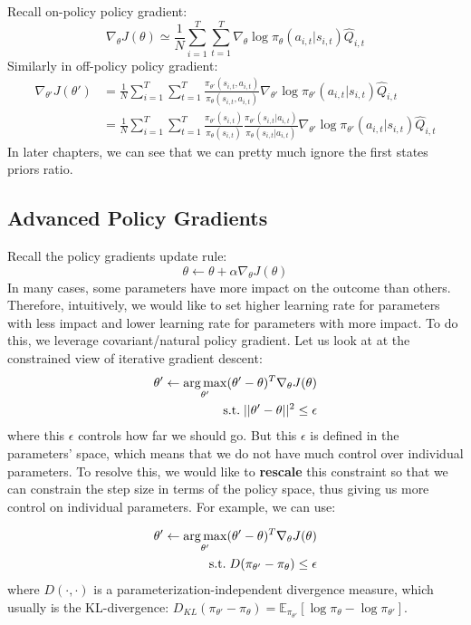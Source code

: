 Recall on-policy policy gradient:
$$\nabla_{\theta}J(\theta) \simeq \frac{1}{N} \sum_{i=1}^T \sum_{t=1}^T\nabla_\theta \log \pi_\theta(a_{i,t}|s_{i,t})\hat{Q}_{i,t}$$
Similarly in off-policy policy gradient:
\begin{align*}
    \nabla_{\theta'}J(\theta') &= \frac{1}{N} \sum_{i=1}^T \sum_{t=1}^T   \frac{\pi_{\theta'}(s_{i,t},a_{i,t})}{\pi_{\theta}(s_{i,t},a_{i,t})}\nabla_{\theta'} \log \pi_{\theta'}(a_{i,t}|s_{i,t})\hat{Q}_{i,t}\\
    &= \frac{1}{N} \sum_{i=1}^T \sum_{t=1}^T \frac{\pi_{\theta'}(s_{i,t})}{\pi_{\theta}(s_{i,t})}\frac{\pi_{\theta'}(s_{i,t}|a_{i,t})}{\pi_{\theta}(s_{i,t}|a_{i,t})}\nabla_{\theta'} \log \pi_{\theta'}(a_{i,t}|s_{i,t})\hat{Q}_{i,t}
\end{align*}
In later chapters, we can see that we can pretty much ignore the first states priors ratio.

\subsection{Advanced Policy Gradients}
Recall the policy gradients update rule:
\[
\theta\leftarrow\theta + \alpha\nabla_\theta J(\theta)
\]
In many cases, some parameters have more impact on the outcome than others. Therefore, intuitively, we would like to set higher learning rate for parameters with less impact and lower learning rate for parameters with more impact. To do this, we leverage covariant/natural policy gradient. Let us look at at the constrained view of iterative gradient descent:
\begin{equation}
\begin{aligned}
\theta'\leftarrow \operatorname*{arg\,max}_{\theta'}(\theta'-\theta)^T \nabla_{\theta}J(\theta)\\
\mathrm{s.t. }\;||\theta'-\theta||^2\leq\epsilon
    \end{aligned}
\end{equation}
where this $\epsilon$ controls how far we should go. But this $\epsilon$ is defined in the parameters' space, which means that we do not have much control over individual parameters. To resolve this, we would like to \textbf{rescale} this constraint so that we can constrain the step size in terms of the policy space, thus giving us more control on individual parameters. For example, we can use:

\begin{equation}
\begin{aligned}
\theta'\leftarrow \operatorname*{arg\,max}_{\theta'}(\theta'-\theta)^T \nabla_{\theta}J(\theta)\\
\mathrm{s.t. }\;D(\pi_{\theta'}-\pi_\theta)\leq\epsilon
    \end{aligned}
\end{equation}
where $D(\cdot, \cdot)$ is a parameterization-independent divergence measure, which usually is the KL-divergence: $D_{KL}(\pi_{\theta'}-\pi_\theta) = \mathbb{E}_{\pi_{\theta'}}[\log\pi_\theta - \log\pi_{\theta'}]$.

